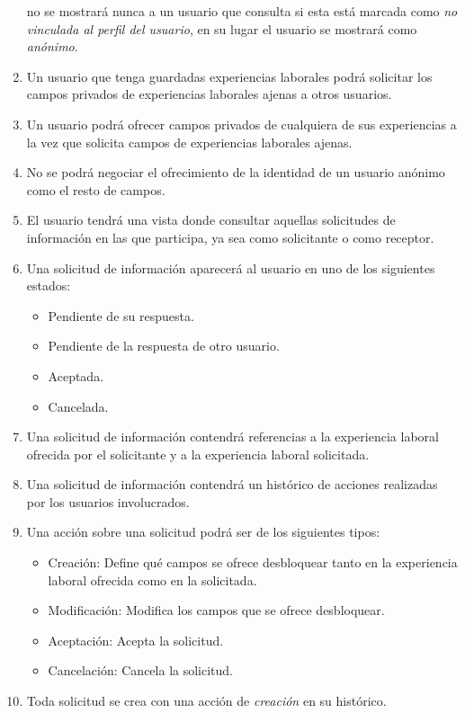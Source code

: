 \documentclass[a4paper, 12pt]{book}
\begin{document}
\begin{enumerate}
        no se mostrará nunca a un usuario que consulta si esta está marcada como \emph{no vinculada al perfil del usuario},
        en su lugar el usuario se mostrará como \emph{anónimo}.
        \item Un usuario que tenga guardadas experiencias laborales podrá solicitar los campos privados de experiencias laborales ajenas a otros usuarios.
        \item Un usuario podrá ofrecer campos privados de cualquiera de sus experiencias a la vez que solicita campos de experiencias laborales ajenas.
        \item No se podrá negociar el ofrecimiento de la identidad de un usuario anónimo como el resto de campos.
        \item El usuario tendrá una vista donde consultar aquellas solicitudes de información en las que participa, ya sea como solicitante o como receptor.
        \item Una solicitud de información aparecerá al usuario en uno de los siguientes estados:
        \begin{itemize}
            \item Pendiente de su respuesta.
            \item Pendiente de la respuesta de otro usuario.
            \item Aceptada.
            \item Cancelada.
        \end{itemize}
        \item Una solicitud de información contendrá referencias a la experiencia laboral ofrecida por el solicitante y a la experiencia laboral solicitada.
        \item Una solicitud de información contendrá un histórico de acciones realizadas por los usuarios involucrados.
        \item Una acción sobre una solicitud podrá ser de los siguientes tipos:
        \begin{itemize}
            \item Creación: Define qué campos se ofrece desbloquear tanto en la experiencia laboral ofrecida como en la solicitada.
            \item Modificación: Modifica los campos que se ofrece desbloquear.
            \item Aceptación: Acepta la solicitud.
            \item Cancelación: Cancela la solicitud.
        \end{itemize}
        \item Toda solicitud se crea con una acción de \emph{creación} en su histórico.

\end{enumerate}
\end{document}
